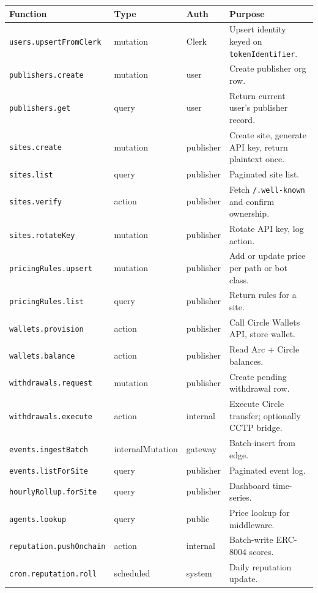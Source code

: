 \documentclass[11pt,a4paper]{article}
\begin{document}
\begin{table}[H]
\centering
\footnotesize
\begin{tabularx}{\textwidth}{@{} l l l X @{}}
\toprule
\textbf{Function} & \textbf{Type} & \textbf{Auth} & \textbf{Purpose} \\
\midrule
\texttt{users.upsertFromClerk} & mutation & Clerk & Upsert identity keyed on \texttt{tokenIdentifier}. \\
\texttt{publishers.create} & mutation & user & Create publisher org row. \\
\texttt{publishers.get} & query & user & Return current user's publisher record. \\
\texttt{sites.create} & mutation & publisher & Create site, generate API key, return plaintext once. \\
\texttt{sites.list} & query & publisher & Paginated site list. \\
\texttt{sites.verify} & action & publisher & Fetch \texttt{/.well-known} and confirm ownership. \\
\texttt{sites.rotateKey} & mutation & publisher & Rotate API key, log action. \\
\texttt{pricingRules.upsert} & mutation & publisher & Add or update price per path or bot class. \\
\texttt{pricingRules.list} & query & publisher & Return rules for a site. \\
\texttt{wallets.provision} & action & publisher & Call Circle Wallets API, store wallet. \\
\texttt{wallets.balance} & action & publisher & Read Arc + Circle balances. \\
\texttt{withdrawals.request} & mutation & publisher & Create pending withdrawal row. \\
\texttt{withdrawals.execute} & action & internal & Execute Circle transfer; optionally CCTP bridge. \\
\texttt{events.ingestBatch} & internalMutation & gateway & Batch-insert from edge. \\
\texttt{events.listForSite} & query & publisher & Paginated event log. \\
\texttt{hourlyRollup.forSite} & query & publisher & Dashboard time-series. \\
\texttt{agents.lookup} & query & public & Price lookup for middleware. \\
\texttt{reputation.pushOnchain} & action & internal & Batch-write ERC-8004 scores. \\
\texttt{cron.reputation.roll} & scheduled & system & Daily reputation update. \\

\end{tabularx}
\end{table}
\end{document}
